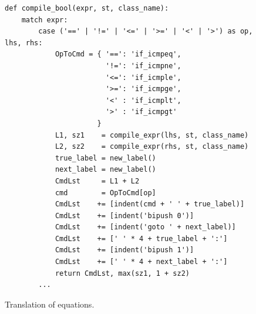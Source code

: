 \begin{figure}[!ht]
\centering
\begin{verbatim}
def compile_bool(expr, st, class_name):
    match expr:
        case ('==' | '!=' | '<=' | '>=' | '<' | '>') as op, lhs, rhs:
            OpToCmd = { '==': 'if_icmpeq',
                        '!=': 'if_icmpne',
                        '<=': 'if_icmple',
                        '>=': 'if_icmpge',
                        '<' : 'if_icmplt',
                        '>' : 'if_icmpgt'
                      }
            L1, sz1    = compile_expr(lhs, st, class_name)
            L2, sz2    = compile_expr(rhs, st, class_name)
            true_label = new_label()
            next_label = new_label()
            CmdLst     = L1 + L2
            cmd        = OpToCmd[op]
            CmdLst    += [indent(cmd + ' ' + true_label)]
            CmdLst    += [indent('bipush 0')]
            CmdLst    += [indent('goto ' + next_label)]
            CmdLst    += [' ' * 4 + true_label + ':']
            CmdLst    += [indent('bipush 1')]
            CmdLst    += [' ' * 4 + next_label + ':']
            return CmdLst, max(sz1, 1 + sz2)
        ...
\end{verbatim}
\vspace*{-0.3cm}
\caption{Translation of equations.}
\label{fig:Compiler.ipynb:compile:eq}
\end{figure}

